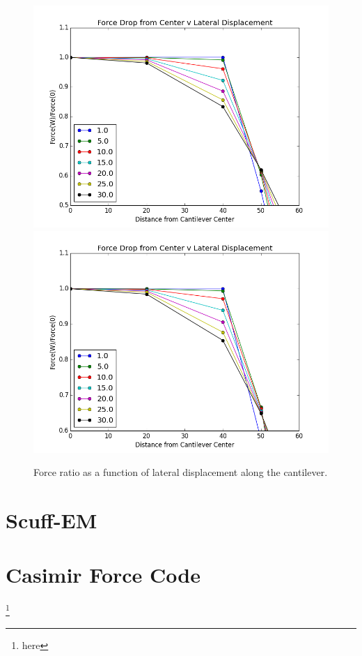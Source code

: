 \documentclass[11pt,traditabstract]{article}
\begin{document}
\begin{figure}[h]
\centering
\includegraphics[width=5in]{lateral_force_drop_zoom}
\includegraphics[width=5in]{lateral_force_drop_finite_zoom}
\caption{Force ratio as a function of lateral displacement along the cantilever.}\label{fig:latdropZoom}
\end{figure}

\pagebreak
\appendix
\section{Scuff-EM}
\section{Casimir Force Code}



\thanks{here}
\end{document}
